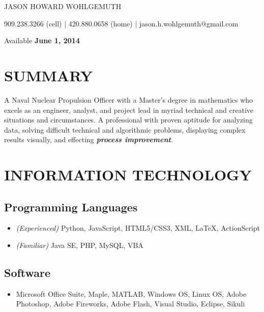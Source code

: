 \documentclass[10pt]{article}
\begin{document}
\begin{center}\Huge {JASON HOWARD WOHLGEMUTH}\end{center}
\begin{center} 909.238.3266 (cell) | 420.880.0658 (home) | jason.h.wohlgemuth@gmail.com\end{center}
\begin{center} Available \textbf{June 1, 2014}\end{center}

\section{SUMMARY}\label{summary}

A Naval Nuclear Propulsion Officer with a Master's degree in mathematics
who excels as an engineer, analyst, and project lead in myriad technical
and creative situations and circumstances. A professional with proven
aptitude for analyzing data, solving difficult technical and algorithmic
problems, displaying complex results visually, and effecting
\textbf{\emph{process improvement}}.

\section{INFORMATION TECHNOLOGY}\label{information-technology}

\subsection{Programming Languages}\label{programming-languages}

\begin{itemize}
\itemsep1pt\parskip0pt
\item
  \emph{(Experienced)} Python, JavaScript, HTML5/CSS3, XML, LaTeX,
  ActionScript
\item
  \emph{(Familiar)} Java SE, PHP, MySQL, VBA
\end{itemize}

\subsection{Software}\label{software}

\begin{itemize}
\itemsep1pt\parskip0pt
\item
  Microsoft Office Suite, Maple, MATLAB, Windows OS, Linux OS, Adobe
  Photoshop, Adobe Fireworks, Adobe Flash, Visual Studio, Eclipse,
  Sikuli
\end{itemize}
\end{document}
